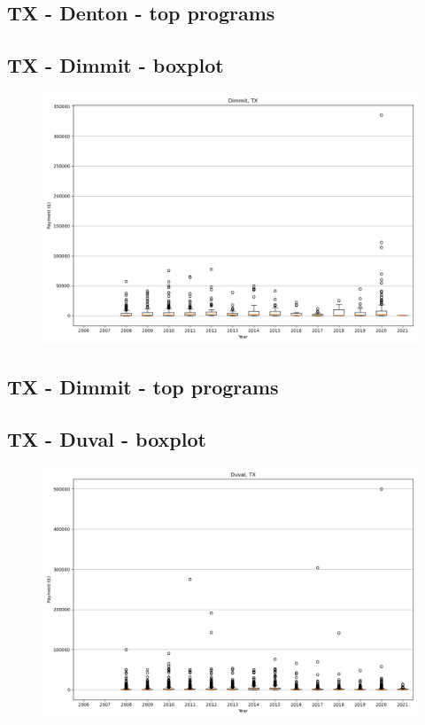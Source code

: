 \subsection*{TX - Denton - top programs}

\newpage
\subsection*{TX - Dimmit - boxplot}
\begin{figure}[h]
\centering
\includegraphics[width=7in]{../output/boxplots/counties/Dimmit-TX_boxplot.png}
\end{figure}


\subsection*{TX - Dimmit - top programs}

\newpage
\subsection*{TX - Duval - boxplot}
\begin{figure}[h]
\centering
\includegraphics[width=7in]{../output/boxplots/counties/Duval-TX_boxplot.png}
\end{figure}


